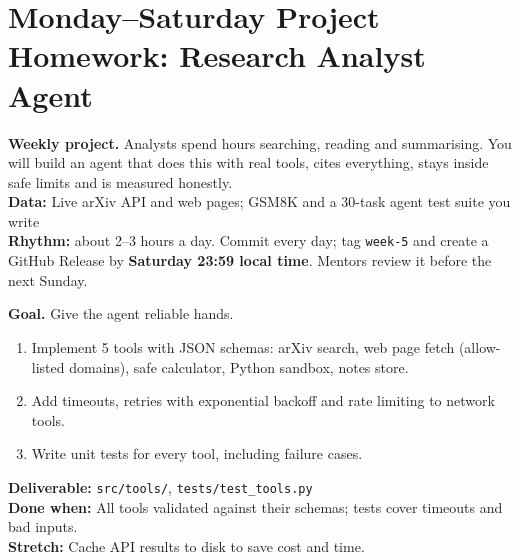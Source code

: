 \clearpage
\section*{Monday--Saturday Project Homework: Research Analyst Agent}
\begin{tcolorbox}[enhanced,colback=navy,colframe=gold,boxrule=0.8pt,arc=3pt,coltext=white,left=8pt,right=8pt,top=6pt,bottom=6pt]
{\color{gold}\bfseries Weekly project.} Analysts spend hours searching, reading and summarising. You will build an agent that does this with real tools, cites everything, stays inside safe limits and is measured honestly.\\[3pt]
{\color{gold}\bfseries Data:} Live arXiv API and web pages; GSM8K and a 30-task agent test suite you write\\[3pt]
{\color{gold}\bfseries Rhythm:} about 2--3 hours a day. Commit every day; tag \texttt{week-5} and create a GitHub Release by \textbf{Saturday 23:59 local time}. Mentors review it before the next Sunday.
\end{tcolorbox}

\begin{tcolorbox}[enhanced,breakable,colback=white,colframe=sun,boxrule=0.8pt,arc=2pt,left=7pt,right=7pt,top=4pt,bottom=4pt,
  title={\bfseries Monday --- A tested tool layer\hfill\normalfont\small 3 h},coltitle=white,colbacktitle=sun,fonttitle=\small]
\textbf{Goal.} Give the agent reliable hands.
\begin{enumerate}[itemsep=1pt,topsep=2pt]
  \item Implement 5 tools with JSON schemas: arXiv search, web page fetch (allow-listed domains), safe calculator, Python sandbox, notes store.
  \item Add timeouts, retries with exponential backoff and rate limiting to network tools.
  \item Write unit tests for every tool, including failure cases.
\end{enumerate}
\textbf{\color{dataC}Deliverable:} \texttt{src/tools/}, \texttt{tests/test\_tools.py}\\
\textbf{\color{navy}Done when:} All tools validated against their schemas; tests cover timeouts and bad inputs.\\
\textbf{\color{skillC}Stretch:} Cache API results to disk to save cost and time.
\end{tcolorbox}

